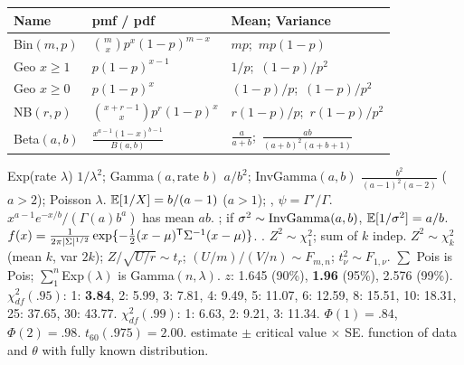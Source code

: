 \par
{\renewcommand{\arraystretch}{1.08}%
\begin{tabular}{@{}|p{}|p{}|p{}|@{}}\hline
\rowcolor{hdr}Name&pmf / pdf&Mean; Variance\\\hline
Bin$(m,p)$&$\binom mxp^x(1-p)^{m-x}$&$mp$;\ $mp(1-p)$\\\hline
Geo $x{\ge}1$&$p(1-p)^{x-1}$&$1/p$;\ $(1{-}p)/p^2$\\\hline
Geo $x{\ge}0$&$p(1-p)^x$&$(1{-}p)/p$;\ $(1{-}p)/p^2$\\\hline
NB$(r,p)$&$\binom{x+r-1}{x}p^r(1-p)^x$&$r(1{-}p)/p$;\ $r(1{-}p)/p^2$\\\hline
Beta$(a,b)$&$\frac{x^{a-1}(1-x)^{b-1}}{B(a,b)}$&$\frac a{a+b}$;\ $\frac{ab}{(a+b)^2(a+b+1)}$\\\hline
\end{tabular}}
\sk{} Exp(rate $\lambda$) $1/\lambda^2$; Gamma$(a,\text{rate }b)$ $a/b^2$; InvGamma$(a,b)$ $\frac{b^2}{(a-1)^2(a-2)}$ ($a>2$); Poisson $\lambda$.
\sk{} $\mathbb{E}[1/X]=b/(a-1)$ ($a>1$); , $\psi=\Gamma'/\Gamma$.  $x^{a-1}e^{-x/b}/(\Gamma(a)b^a)$ has mean $ab$. ; if $\sigma^2\sim\mathrm{InvGamma}(a,b)$, $\mathbb{E}[1/\sigma^2]=a/b$.
\sk{} $f(x)=\frac{1}{2\pi|\Sigma|^{1/2}}\exp\{-\frac12(x-\mu)^{\mathsf T}\Sigma^{-1}(x-\mu)\}$. .
\sk{} $Z^2\sim\chi^2_1$; sum of $k$ indep. $Z^2\sim\chi^2_k$ (mean $k$, var $2k$); $Z/\sqrt{U/r}\sim t_r$; $(U/m)/(V/n)\sim F_{m,n}$; $t_\nu^2\sim F_{1,\nu}$. $\sum$ Pois is Pois; $\sum_1^n$Exp$(\lambda)$ is Gamma$(n,\lambda)$.
\sk{} $z$: 1.645 (90\%), \textbf{1.96} (95\%), 2.576 (99\%). $\chi^2_{df}(.95)$: 1: \textbf{3.84}, 2: 5.99, 3: 7.81, 4: 9.49, 5: 11.07, 6: 12.59, 8: 15.51, 10: 18.31, 25: 37.65, 30: 43.77. $\chi^2_{df}(.99)$: 1: 6.63, 2: 9.21, 3: 11.34. $\Phi(1)=.84$, $\Phi(2)=.98$. $t_{60}(.975)=2.00$.
\bx
{} estimate $\pm$ critical value $\times$ SE.  function of data and $\theta$ with fully known distribution.
